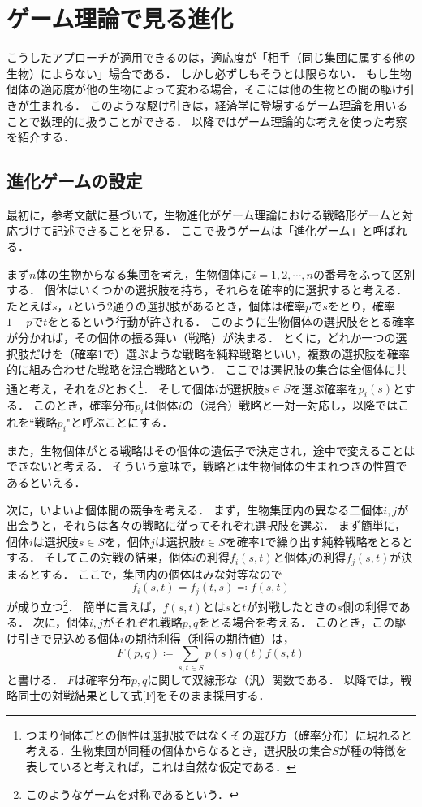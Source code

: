\section{ゲーム理論で見る進化}
こうしたアプローチが適用できるのは，適応度が「相手（同じ集団に属する他の生物）によらない」場合である．
しかし必ずしもそうとは限らない．
もし生物個体の適応度が他の生物によって変わる場合，そこには他の生物との間の駆け引きが生まれる．
このような駆け引きは，経済学に登場するゲーム理論を用いることで数理的に扱うことができる．
以降ではゲーム理論的な考えを使った考察を紹介する．

\subsection{進化ゲームの設定}
最初に，参考文献\cite{game}に基づいて，生物進化がゲーム理論における戦略形ゲームと対応づけて記述できることを見る．
ここで扱うゲームは「進化ゲーム」と呼ばれる．

まず$n$体の生物からなる集団を考え，生物個体に$i=1,2,\cdots ,n$の番号をふって区別する．
個体はいくつかの選択肢を持ち，それらを確率的に選択すると考える．
たとえば$s$，$t$という2通りの選択肢があるとき，個体は確率$p$で$s$をとり，確率$1-p$で$t$をとるという行動が許される．
このように生物個体の選択肢をとる確率が分かれば，その個体の振る舞い（戦略）が決まる．
とくに，どれか一つの選択肢だけを（確率1で）選ぶような戦略を純粋戦略といい，複数の選択肢を確率的に組み合わせた戦略を混合戦略という．
ここでは選択肢の集合は全個体に共通と考え，それを$S$とおく\footnote{つまり個体ごとの個性は選択肢ではなくその選び方（確率分布）に現れると考える．生物集団が同種の個体からなるとき，選択肢の集合$S$が種の特徴を表していると考えれば，これは自然な仮定である．}．
そして個体$i$が選択肢$s\in S$を選ぶ確率を$p_i(s)$とする．
このとき，確率分布$p_i$は個体$i$の（混合）戦略と一対一対応し，以降ではこれを``戦略$p_i$"と呼ぶことにする．

また，生物個体がとる戦略はその個体の遺伝子で決定され，途中で変えることはできないと考える．
そういう意味で，戦略とは生物個体の生まれつきの性質であるといえる．

次に，いよいよ個体間の競争を考える．
まず，生物集団内の異なる二個体$i,j$が出会うと，それらは各々の戦略に従ってそれぞれ選択肢を選ぶ．
まず簡単に，個体$i$は選択肢$s\in S$を，個体$j$は選択肢$t\in S$を確率1で繰り出す純粋戦略をとるとする．
そしてこの対戦の結果，個体$i$の利得$f_i(s,t)$と個体$j$の利得$f_j(s,t)$が決まるとする．
ここで，集団内の個体はみな対等なので
\begin{equation}
  f_i(s,t) = f_j(t,s) \eqqcolon f(s,t)
\end{equation}
が成り立つ\footnote{このようなゲームを対称であるという．}．
簡単に言えば，$f(s,t)$とは$s$と$t$が対戦したときの$s$側の利得である．
次に，個体$i,j$がそれぞれ戦略$p,q$をとる場合を考える．
このとき，この駆け引きで見込める個体$i$の期待利得（利得の期待値）は，
\begin{equation}
  F(p,q) \coloneqq \sum_{s,t\in S} p(s) q(t) f(s,t) \label{F}
\end{equation}
と書ける．
$F$は確率分布$p,q$に関して双線形な（汎）関数である．
以降では，戦略同士の対戦結果として式\eqref{F}をそのまま採用する．

